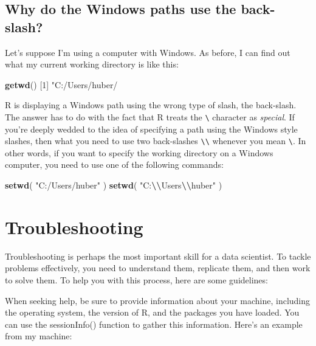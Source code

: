 \documentclass[
  12pt,
  oneside]{book}
\newenvironment{Shaded}{\begin{snugshade}}{\end{snugshade}}
\newcommand{\DecValTok}[1]{\textcolor[rgb]{0.00,0.00,0.81}{#1}}
\newcommand{\FunctionTok}[1]{\textcolor[rgb]{0.13,0.29,0.53}{\textbf{#1}}}
\newcommand{\NormalTok}[1]{#1}
\newcommand{\SpecialCharTok}[1]{\textcolor[rgb]{0.81,0.36,0.00}{\textbf{#1}}}
\newcommand{\StringTok}[1]{\textcolor[rgb]{0.31,0.60,0.02}{#1}}
\begin{document}
\hypertarget{sec:winbackslash}{%
\subsection{Why do the Windows paths use the back-slash?}\label{sec:winbackslash}}

Let's suppose I'm using a computer with Windows. As before, I can find out what my current working directory is like this:

\begin{Shaded}
\begin{Highlighting}[]
\FunctionTok{getwd}\NormalTok{()}
\NormalTok{[}\DecValTok{1}\NormalTok{] }\StringTok{"C:/Users/huber/}
\end{Highlighting}
\end{Shaded}

R is displaying a Windows path using the wrong type of slash, the back-slash. The answer has to do with the fact that R treats the \texttt{\textbackslash{}} character as \emph{special}. If you're deeply wedded to the idea of specifying a path using the Windows style slashes, then what you need to use two back-slashes \texttt{\textbackslash{}\textbackslash{}} whenever you mean \texttt{\textbackslash{}}. In other words, if you want to specify the working directory on a Windows computer, you need to use one of the following commands:

\begin{Shaded}
\begin{Highlighting}[]
\FunctionTok{setwd}\NormalTok{( }\StringTok{"C:/Users/huber"}\NormalTok{ )}
\FunctionTok{setwd}\NormalTok{( }\StringTok{"C:}\SpecialCharTok{\textbackslash{}\textbackslash{}}\StringTok{Users}\SpecialCharTok{\textbackslash{}\textbackslash{}}\StringTok{huber"}\NormalTok{ )}
\end{Highlighting}
\end{Shaded}

\hypertarget{troubleshooting}{%
\section{Troubleshooting}\label{troubleshooting}}

Troubleshooting is perhaps the most important skill for a data scientist. To tackle problems effectively, you need to understand them, replicate them, and then work to solve them. To help you with this process, here are some guidelines:

When seeking help, be sure to provide information about your machine, including the operating system, the version of R, and the packages you have loaded. You can use the sessionInfo() function to gather this information. Here's an example from my machine:
\end{document}
